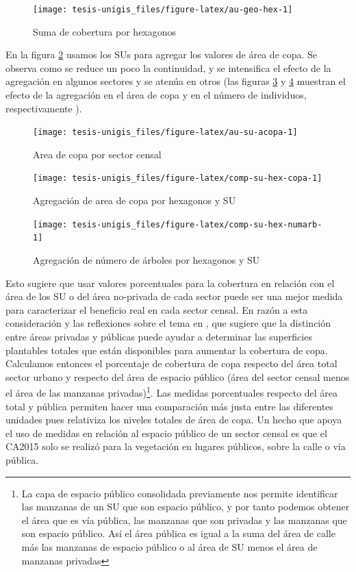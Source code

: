 \documentclass[12pt,]{book}
\let\rmarkdownfootnote\footnote%
\def\footnote{\protect\rmarkdownfootnote}
\begin{document}
\begin{figure}
\texttt{[image: tesis-unigis\_files/figure-latex/au-geo-hex-1]} \caption{Suma de cobertura por hexagonos}\label{fig:au-geo-hex}
\end{figure}

En la figura \ref{fig:au-su-acopa} usamos los SUs para agregar los
valores de área de copa. Se observa como se reduce un poco la
continuidad, y se intensifica el efecto de la agregación en algunos
sectores y se atenúa en otros (las figuras \ref{fig:comp-su-hex-copa} y
\ref{fig:comp-su-hex-numarb} muestran el efecto de la agregación en el
área de copa y en el número de individuos, respectivamente ).

\begin{figure}
\texttt{[image: tesis-unigis\_files/figure-latex/au-su-acopa-1]} \caption{Area de copa por sector censal}\label{fig:au-su-acopa}
\end{figure}

\begin{figure}
\texttt{[image: tesis-unigis\_files/figure-latex/comp-su-hex-copa-1]} \caption{Agregación de area de copa por hexagonos y SU}\label{fig:comp-su-hex-copa}
\end{figure}

\begin{figure}
\texttt{[image: tesis-unigis\_files/figure-latex/comp-su-hex-numarb-1]} \caption{Agregación de número de árboles por hexagonos y SU}\label{fig:comp-su-hex-numarb}
\end{figure}

Esto sugiere que usar valores porcentuales para la cobertura en relación
con el área de los SU o del área no-privada de cada sector puede ser una
mejor medida para caracterizar el beneficio real en cada sector censal.
En razón a esta consideración y las reflexiones sobre el tema en
\citet{schwarz_trees_2015}, que sugiere que la distinción entre áreas
privadas y públicas puede ayudar a determinar las superficies plantables
totales que están disponibles para aumentar la cobertura de copa.
Calculamos entonces el porcentaje de cobertura de copa respecto del área
total sector urbano y respecto del área de espacio público (área del
sector censal menos el área de las manzanas privadas)\footnote{La capa
  de espacio público consolidada previamente nos permite identificar las
  manzanas de un SU que son espacio público, y por tanto podemos obtener
  el área que es vía pública, las manzanas que son privadas y las
  manzanas que son espacio público. Así el área pública es igual a la
  suma del área de calle más las manzanas de espacio público o al área
  de SU menos el área de manzanas privadas}. Las medidas porcentuales
respecto del área total y pública permiten hacer una comparación más
justa entre las diferentes unidades pues relativiza los niveles totales
de área de copa. Un hecho que apoya el uso de medidas en relación al
espacio público de un sector censal es que el CA2015 solo se realizó
para la vegetación en lugares públicos, sobre la calle o vía pública.
\end{document}
